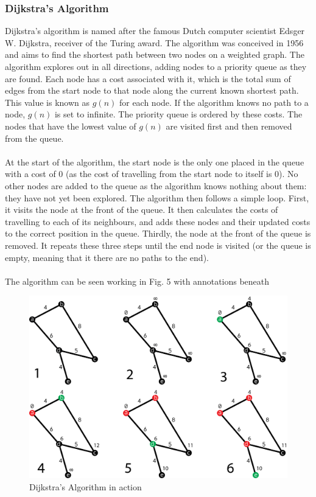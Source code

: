 \documentclass[titlepage]{article}
\begin{document}
\subsubsection{Dijkstra's Algorithm}
Dijkstra's algorithm is named after the famous Dutch computer scientist Edsger W. Dijkstra, receiver of the Turing award. The algorithm was conceived in 1956 and aims to find the shortest path between two nodes on a weighted graph. The algorithm explores out in all directions, adding nodes to a priority queue as they are found. Each node has a cost associated with it, which is the total sum of edges from the start node to that node along the current known shortest path. This value is known as $g(n)$ for each node. If the algorithm knows no path to a node, $g(n)$ is set to infinite. The priority queue is ordered by these costs. The nodes that have the lowest value of $g(n)$ are visited first and then removed from the queue. 
\\\\
At the start of the algorithm, the start node is the only one placed in the queue with a cost of 0 (as the cost of travelling from the start node to itself is 0). No other nodes are added to the queue as the algorithm knows nothing about them: they have not yet been explored. The algorithm then follows a simple loop. First, it visits the node at the front of the queue. It then calculates the costs of travelling to each of its neighbours, and adds these nodes and their updated costs to the correct position in the queue. Thirdly, the node at the front of the queue is removed. It repeats these three steps until the end node is visited (or the queue is empty, meaning that it there are no paths to the end). \cite{textbook}
\\\\
The algorithm can be seen working in Fig. 5 with annotations beneath 
\begin{figure}[H]
  \centering
  \includegraphics[width=12cm]{Dijkstra.png}
  \caption{Dijkstra's Algorithm in action}
  \label{fig:dijk}
\end{figure}
\end{document}
